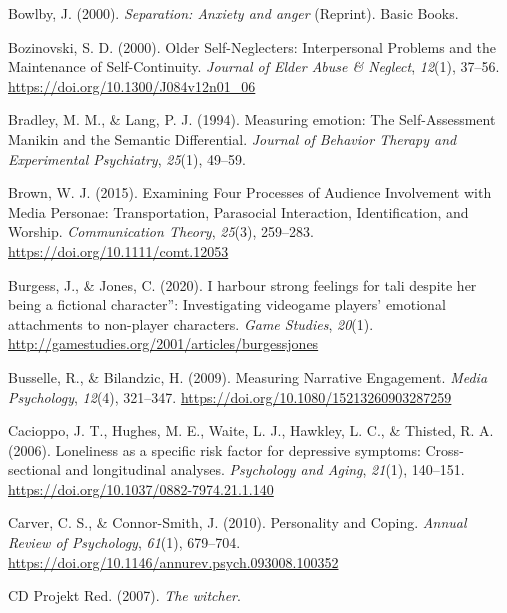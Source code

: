 \documentclass[
]{udthesis}
\newlength{\cslhangindent}
\newenvironment{CSLReferences}[2] %
 {\begin{list}{}{%
  \setlength{\itemindent}{0pt}
  \setlength{\leftmargin}{0pt}
  \setlength{\parsep}{0pt}
  \ifodd #1
   \setlength{\leftmargin}{\cslhangindent}
   \setlength{\itemindent}{-1\cslhangindent}
  \fi
  \setlength{\itemsep}{#2\baselineskip}}}
 {\end{list}}
\begin{document}
\begin{CSLReferences}{1}{0}
Bowlby, J. (2000). \emph{Separation: Anxiety and anger} (Reprint). {Basic Books}.

Bozinovski, S. D. (2000). Older {Self}-{Neglecters}: {Interpersonal Problems} and the {Maintenance} of {Self}-{Continuity}. \emph{Journal of Elder Abuse \& Neglect}, \emph{12}(1), 37--56. \url{https://doi.org/10.1300/J084v12n01_06}

Bradley, M. M., \& Lang, P. J. (1994). Measuring emotion: The {Self}-{Assessment Manikin} and the {Semantic Differential}. \emph{Journal of Behavior Therapy and Experimental Psychiatry}, \emph{25}(1), 49--59.

Brown, W. J. (2015). Examining {Four Processes} of {Audience Involvement} with {Media Personae}: {Transportation}, {Parasocial Interaction}, {Identification}, and {Worship}. \emph{Communication Theory}, \emph{25}(3), 259--283. \url{https://doi.org/10.1111/comt.12053}

Burgess, J., \& Jones, C. (2020). I harbour strong feelings for tali despite her being a fictional character{''}: Investigating videogame players{'} emotional attachments to non-player characters. \emph{Game Studies}, \emph{20}(1). \url{http://gamestudies.org/2001/articles/burgessjones}

Busselle, R., \& Bilandzic, H. (2009). Measuring {Narrative Engagement}. \emph{Media Psychology}, \emph{12}(4), 321--347. \url{https://doi.org/10.1080/15213260903287259}

Cacioppo, J. T., Hughes, M. E., Waite, L. J., Hawkley, L. C., \& Thisted, R. A. (2006). Loneliness as a specific risk factor for depressive symptoms: {Cross}-sectional and longitudinal analyses. \emph{Psychology and Aging}, \emph{21}(1), 140--151. \url{https://doi.org/10.1037/0882-7974.21.1.140}

Carver, C. S., \& Connor-Smith, J. (2010). Personality and {Coping}. \emph{Annual Review of Psychology}, \emph{61}(1), 679--704. \url{https://doi.org/10.1146/annurev.psych.093008.100352}

CD Projekt Red. (2007). \emph{The witcher}.


\end{CSLReferences}
\end{document}
